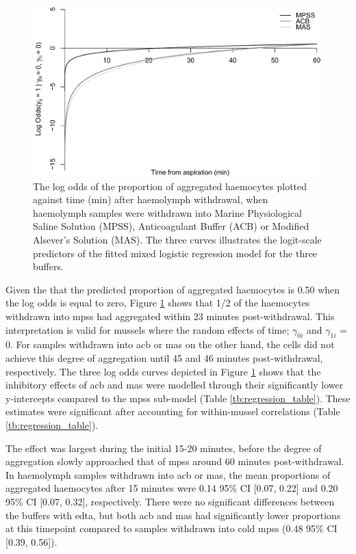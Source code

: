 \begin{figure}[!ht]
    \centering
    \includegraphics[width=1.0\textwidth]{figures/Method development/Log Odds plot.pdf}
    \caption{The log odds of the proportion of aggregated haemocytes plotted against time (min) after haemolymph withdrawal, when haemolymph samples were withdrawn into Marine Physiological Saline Solution (MPSS), Anticoagulant Buffer (ACB) or Modified Alsever's Solution (MAS). The three curves illustrates the logit-scale predictors of the fitted mixed logistic regression model for the three buffers.}
    \label{fig:LogOdds}
\end{figure}

Given the that the predicted proportion of aggregated haemocytes is 0.50 when the log odds is equal to zero, Figure \ref{fig:LogOdds} shows that 1/2 of the haemocytes withdrawn into \acrshort{mpss} had aggregated within 23 minutes post-withdrawal. This interpretation is valid for mussels where the random effects of time; $\gamma_{0i}$ and $\gamma_{1i}$ = 0. For samples withdrawn into \acrshort{acb} or \acrshort{mas} on the other hand, the cells did not achieve this degree of aggregation until 45 and 46 minutes post-withdrawal, respectively. The three log odds curves depicted in Figure \ref{fig:LogOdds} shows that the inhibitory effects of \acrshort{acb} and \acrshort{mas} were modelled through their significantly lower y-intercepts compared to the \acrshort{mpss} sub-model (Table \ref{tb:regression_table}). These estimates were significant after accounting for within-mussel correlations (Table \ref{tb:regression_table}).

The effect was largest during the initial 15-20 minutes, before the degree of aggregation slowly approached that of \acrshort{mpss} around 60 minutes post-withdrawal. In haemolymph samples withdrawn into \acrshort{acb} or \acrshort{mas}, the mean proportions of aggregated haemocytes after 15 minutes were 0.14 95\% CI [0.07, 0.22] and  0.20 95\% CI [0.07, 0.32], respectively. There were no significant differences between the buffers with \acrshort{edta}, but both \acrshort{acb} and \acrshort{mas} had significantly lower proportions at this timepoint compared to samples withdrawn into cold \acrshort{mpss} (0.48 95\% CI [0.39, 0.56]).

